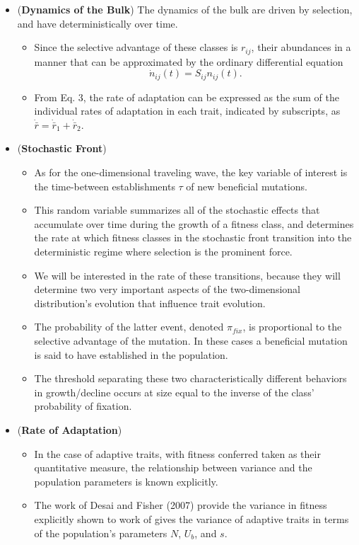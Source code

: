 \documentclass[11pt,one column]{article}
\begin{document}
\begin{itemize}
\item (\textbf{Dynamics of the Bulk}) The dynamics of the bulk are driven by selection, and have deterministically over time.
	\begin{itemize}
	\item Since the selective advantage of these classes is $r_{ij}$, their abundances in a manner that can be approximated by the ordinary differential equation \[ \dot{n}_{ij}(t) = S_{ij} n_{ij}(t). \] 
	\item From Eq. 3, the rate of adaptation can be expressed as the sum of the individual rates of adaptation in each trait, indicated by subscripts, as $\dot{\bar{r}}=\dot{\bar{r}}_1 +\dot{\bar{r}}_2$.
	\end{itemize}
\item (\textbf{Stochastic Front})
	\begin{itemize}
	\item As for the one-dimensional traveling wave, the key variable of interest is the time-between establishments $\tau$ of new beneficial mutations. 
	\item This random variable summarizes all of the stochastic effects that accumulate over time during the growth of a fitness class, and determines the rate at which fitness classes in the stochastic front transition into the deterministic regime where selection is the prominent force. 
	\item We will be interested in the rate of these transitions, because they will determine two very important aspects of the two-dimensional distribution’s evolution that influence trait evolution. 
	\item The probability of the latter event, denoted $\pi_{fix}$, is proportional to the selective advantage of the mutation. In these cases a beneficial mutation is said to have established in the population. 
	\item The threshold separating these two characteristically different behaviors in growth/decline occurs at size equal to the inverse of the class' probability of fixation.
	\end{itemize}
\item (\textbf{Rate of Adaptation})
	\begin{itemize}
	\item In the case of adaptive traits, with fitness conferred taken as their quantitative measure, the relationship between variance and the population parameters is known explicitly. 
	\item The work of Desai and Fisher (2007) provide the variance in fitness explicitly shown to work of gives the variance of adaptive traits in terms of the population’s parameters $N$, $U_b$, and $s$. 

\end{itemize}
\end{itemize}
\end{document}
